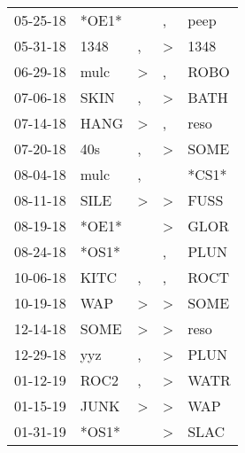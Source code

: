 \begin{supertabular}{p{0.07\textwidth}p{0.06\textwidth}p{0.02\textwidth}p{0.02\textwidth}p{0.06\textwidth}}
 05-25-18\textsuperscript{} &                   *OE1* &               &                , &  peep\textsuperscript{} \\
 05-31-18\textsuperscript{} &  1348\textsuperscript{} &             , &     \textgreater &  1348\textsuperscript{} \\
 06-29-18\textsuperscript{} &  mulc\textsuperscript{} &  \textgreater &                , &  ROBO\textsuperscript{} \\
 07-06-18\textsuperscript{} &  SKIN\textsuperscript{} &             , &     \textgreater &  BATH\textsuperscript{} \\
 07-14-18\textsuperscript{} &  HANG\textsuperscript{} &  \textgreater &                , &  reso\textsuperscript{} \\
 07-20-18\textsuperscript{} &   40s\textsuperscript{} &             , &     \textgreater &  SOME\textsuperscript{} \\
 08-04-18\textsuperscript{} &  mulc\textsuperscript{} &             , &                  &                   *CS1* \\
 08-11-18\textsuperscript{} &  SILE\textsuperscript{} &  \textgreater &     \textgreater &  FUSS\textsuperscript{} \\
 08-19-18\textsuperscript{} &                   *OE1* &               &     \textgreater &  GLOR\textsuperscript{} \\
 08-24-18\textsuperscript{} &                   *OS1* &               &                , &  PLUN\textsuperscript{} \\
 10-06-18\textsuperscript{} &  KITC\textsuperscript{} &             , &                , &  ROCT\textsuperscript{} \\
 10-19-18\textsuperscript{} &   WAP\textsuperscript{} &  \textgreater &     \textgreater &  SOME\textsuperscript{} \\
 12-14-18\textsuperscript{} &  SOME\textsuperscript{} &  \textgreater &     \textgreater &  reso\textsuperscript{} \\
 12-29-18\textsuperscript{} &   yyz\textsuperscript{} &             , &     \textgreater &  PLUN\textsuperscript{} \\
 01-12-19\textsuperscript{} &  ROC2\textsuperscript{} &             , &     \textgreater &  WATR\textsuperscript{} \\
 01-15-19\textsuperscript{} &  JUNK\textsuperscript{} &  \textgreater &     \textgreater &   WAP\textsuperscript{} \\
 01-31-19\textsuperscript{} &                   *OS1* &               &     \textgreater &  SLAC\textsuperscript{} \\

\end{supertabular}
